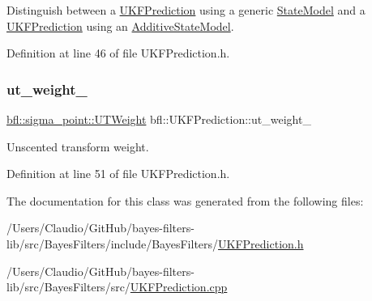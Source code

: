 Distinguish between a \mbox{\hyperlink{classbfl_1_1UKFPrediction}{U\+K\+F\+Prediction}} using a generic \mbox{\hyperlink{classbfl_1_1StateModel}{State\+Model}} and a \mbox{\hyperlink{classbfl_1_1UKFPrediction}{U\+K\+F\+Prediction}} using an \mbox{\hyperlink{classbfl_1_1AdditiveStateModel}{Additive\+State\+Model}}. 



Definition at line 46 of file U\+K\+F\+Prediction.\+h.

\mbox{\label{classbfl_1_1UKFPrediction_abb670fdf17bf2f2e91587904e115a029}} 
\subsubsection{\texorpdfstring{ut\+\_\+weight\+\_\+}{ut\_weight\_}}
{\footnotesize\ttfamily \mbox{\hyperlink{structbfl_1_1sigma__point_1_1UTWeight}{bfl\+::sigma\+\_\+point\+::\+U\+T\+Weight}} bfl\+::\+U\+K\+F\+Prediction\+::ut\+\_\+weight\+\_\+\hspace{0.3cm}{\ttfamily [protected]}}



Unscented transform weight. 



Definition at line 51 of file U\+K\+F\+Prediction.\+h.



The documentation for this class was generated from the following files\+:\begin{DoxyCompactItemize}
\item 
/\+Users/\+Claudio/\+Git\+Hub/bayes-\/filters-\/lib/src/\+Bayes\+Filters/include/\+Bayes\+Filters/\mbox{\hyperlink{UKFPrediction_8h}{U\+K\+F\+Prediction.\+h}}\item 
/\+Users/\+Claudio/\+Git\+Hub/bayes-\/filters-\/lib/src/\+Bayes\+Filters/src/\mbox{\hyperlink{UKFPrediction_8cpp}{U\+K\+F\+Prediction.\+cpp}}\end{DoxyCompactItemize}
